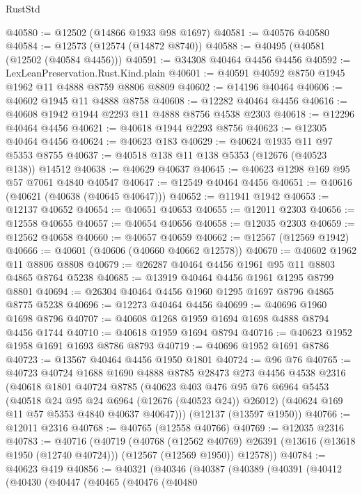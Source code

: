 \begin{lexlean}{RustStd}
\begin{coremodule}
@40580 := @12502 (@14866 @1933 @98 @1697)
@40581 := @40576 @40580
@40584 := @12573 (@12574 (@14872 @8740))
@40588 := @40495 (@40581 (@12502 (@40584 @4456)))
@40591 := @34308 @40464 @4456 @4456
@40592 := LexLeanPreservation.Rust.Kind.plain
@40601 := @40591 @40592 @8750 @1945 @1962 @11 @4888 @8759 @8806 @8809
@40602 := @14196 @40464
@40606 := @40602 @1945 @11 @4888 @8758
@40608 := @12282 @40464 @4456
@40616 := @40608 @1942 @1944 @2293 @11 @4888 @8756 @4538 @2303
@40618 := @12296 @40464 @4456
@40621 := @40618 @1944 @2293 @8756
@40623 := @12305 @40464 @4456
@40624 := @40623 @183
@40629 := @40624 @1935 @11 @97 @5353 @8755
@40637 := @40518 @138 @11 @138 @5353 (@12676 (@40523 @138)) @14512
@40638 := @40629 @40637
@40645 := @40623 @1298 @169 @95 @57 @7061 @4840 @40547
@40647 := @12549 @40464 @4456
@40651 := @40616 (@40621 (@40638 (@40645 @40647)))
@40652 := @11941 @1942
@40653 := @12137 @40652
@40654 := @40651 @40653
@40655 := @12011 @2303
@40656 := @12558 @40655
@40657 := @40654 @40656
@40658 := @12035 @2303
@40659 := @12562 @40658
@40660 := @40657 @40659
@40662 := @12567 (@12569 @1942)
@40666 := @40601 (@40606 (@40660 @40662 @12578))
@40670 := @40602 @1962 @11 @8806 @8808
@40679 := @26287 @40464 @4456 @1961 @95 @11 @8803 @4865 @8764 @5238
@40685 := @13919 @40464 @4456 @1961 @1295 @8799 @8801
@40694 := @26304 @40464 @4456 @1960 @1295 @1697 @8796 @4865 @8775 @5238
@40696 := @12273 @40464 @4456
@40699 := @40696 @1960 @1698 @8796
@40707 := @40608 @1268 @1959 @1694 @1698 @4888 @8794 @4456 @1744
@40710 := @40618 @1959 @1694 @8794
@40716 := @40623 @1952 @1958 @1691 @1693 @8786 @8793
@40719 := @40696 @1952 @1691 @8786
@40723 := @13567 @40464 @4456 @1950 @1801
@40724 := @96 @76
@40765 := @40723
    @40724
    @1688
    @1690
    @4888
    @8785
    @28473
    @273
    @4456
    @4538
    @2316
    (@40618
      @1801
      @40724
      @8785
      (@40623
        @403
        @476
        @95
        @76
        @6964
        @5453
        (@40518 @24 @95 @24 @6964 (@12676 (@40523 @24)) @26012)
        (@40624 @169 @11 @57 @5353 @4840 @40637 @40647)))
    (@12137 (@13597 @1950))
@40766 := @12011 @2316
@40768 := @40765 (@12558 @40766)
@40769 := @12035 @2316
@40783 := @40716
    (@40719
      (@40768
        (@12562 @40769)
        @26391
        (@13616 (@13618 @1950 (@12740 @40724)))
        (@12567 (@12569 @1950))
        @12578))
@40784 := @40623 @419
@40856 := @40321
    (@40346
      (@40387
        (@40389
          (@40391
            (@40412
              (@40430
                (@40447
                  (@40465
                    (@40476
                      (@40480

\end{coremodule}
\end{lexlean}
